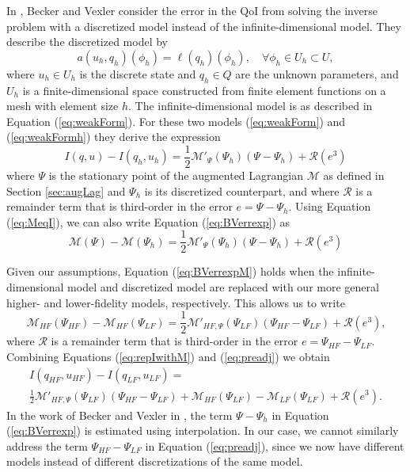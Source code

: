 In \cite{BecVex05}, Becker and Vexler consider the error in the QoI from solving the inverse problem with a discretized model instead of the infinite-dimensional model. They describe the discretized model by
\begin{equation}
a(u_h,q_h)(\phi_h)=\ell(q_h)(\phi_h),\quad\forall\phi_h\in U_h\subset U,
\label{eq:weakFormh}
\end{equation}
where $u_h\in U_h$ is the discrete state and $q_h\in Q$ are the unknown parameters, and $U_h$ is a finite-dimensional space constructed from finite element functions on a mesh with element size $h$. The infinite-dimensional model is as described in Equation (\ref{eq:weakForm}). For these two models (\ref{eq:weakForm}) and (\ref{eq:weakFormh}) they derive the expression
\begin{equation}
I(q,u)-I(q_h,u_h)=\frac{1}{2}\mathcal{M}'_\Psi(\Psi_h)(\Psi-\Psi_h)+\mathcal{R}(e^3)
\label{eq:BVerrexp}
\end{equation}
where $\Psi$ is the stationary point of the augmented Lagrangian $\mathcal{M}$ as defined in Section \ref{sec:augLag} and $\Psi_h$ is its discretized counterpart, and where $\mathcal{R}$ is a remainder term that is third-order in the error $e=\Psi-\Psi_h$. Using Equation (\ref{eq:MeqI}), we can also write Equation (\ref{eq:BVerrexp}) as 
\begin{equation}
\mathcal{M}(\Psi)-\mathcal{M}(\Psi_h)=\frac{1}{2}\mathcal{M}'_\Psi(\Psi_h)(\Psi-\Psi_h)+\mathcal{R}(e^3)
\label{eq:BVerrexpM}
\end{equation}

Given our assumptions, Equation (\ref{eq:BVerrexpM}) holds when the infinite-dimensional model and discretized model are replaced with our more general higher- and lower-fidelity models, respectively. This allows us to write
\begin{equation}
\mathcal{M}_{HF}(\Psi_{HF})-\mathcal{M}_{HF}(\Psi_{LF}) = \frac{1}{2}\mathcal{M}'_{HF,\Psi}(\Psi_{LF})(\Psi_{HF}-\Psi_{LF})+\mathcal{R}(e^3)\textrm{,}
\end{equation}
where $\mathcal{R}$ is a remainder term that is third-order in the error $e=\Psi_{HF}-\Psi_{LF}$. Combining Equations (\ref{eq:repIwithM}) and (\ref{eq:preadj}) we obtain
\begin{multline}
I(q_{HF},u_{HF})-I(q_{LF},u_{LF})=\\\frac{1}{2}\mathcal{M}'_{HF,\Psi}(\Psi_{LF})(\Psi_{HF}-\Psi_{LF})+\mathcal{M}_{HF}(\Psi_{LF})-\mathcal{M}_{LF}(\Psi_{LF})+\mathcal{R}(e^3)\textrm{.} 
\label{eq:preadj}
\end{multline}
In the work of Becker and Vexler in \cite{BecVex05}, the term $\Psi-\Psi_h$ in Equation (\ref{eq:BVerrexp}) is estimated using interpolation. In our case, we cannot similarly address the term $\Psi_{HF}-\Psi_{LF}$ in Equation (\ref{eq:preadj}), since we now have different models instead of different discretizations of the same model. 

